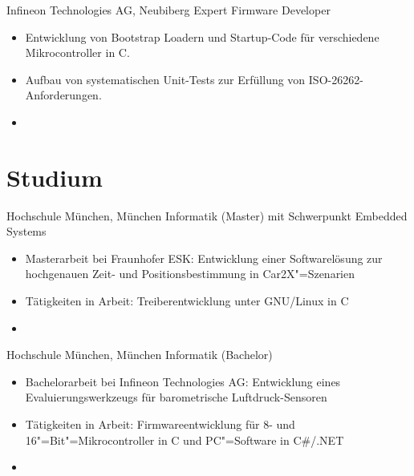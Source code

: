 \documentclass[%
               doublesided,
               paper=a4,
               fontsize=10pt
              ]{my-resume}
\begin{document}
{    
        {Infineon Technologies AG, Neubiberg}
        {Expert Firmware Developer}
        {\begin{itemize}
            \item Entwicklung von Bootstrap Loadern und Startup-Code für verschiedene Mikrocontroller in C.
            \item Aufbau von systematischen Unit-Tests zur Erfüllung von ISO-26262-Anforderungen.
            \item[]   
        \end{itemize}}
    
    \section[\faMortarBoard]{Studium}
        {Hochschule München, München}
        {Informatik (Master) mit Schwerpunkt Embedded Systems}
        {\begin{itemize}
            \item Masterarbeit bei Fraunhofer ESK: Entwicklung einer Softwarelösung zur hochgenauen Zeit- und Positionsbestimmung in Car2X"=Szenarien
            \item Tätigkeiten in Arbeit: Treiberentwicklung unter GNU/Linux in C
            \item[]  
        \end{itemize}}
    
        {Hochschule München, München}
        {Informatik (Bachelor)}
        {\begin{itemize}
            \item Bachelorarbeit bei Infineon Technologies AG: Entwicklung eines Evaluierungswerkzeugs für barometrische Luftdruck-Sensoren
            \item Tätigkeiten in Arbeit: Firmwareentwicklung für 8- und 16"=Bit"=Mikrocontroller in C und PC"=Software in C\#/.NET
            \item[]   
        \end{itemize}}
    
}
\makebody
\clearpage
\end{document}
